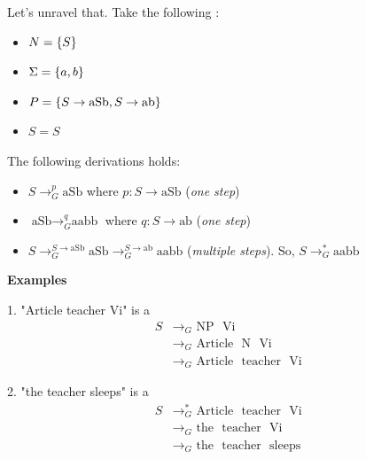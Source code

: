 Let's unravel that. Take the following :
\begin{itemize}
    \item $N = \left\{S\right\}$
    \item $\Sigma = \left\{a,b\right\}$
    \item $P = \left\{S \to \text{aSb}, S \to \text{ab}\right\}$
    \item $S = S$
\end{itemize}
The following derivations holds:
\begin{itemize}
    \item $S \to_{G}^{p} \text{aSb}$ where $p: S \to \text{aSb}$ (\textit{one step})
    \item $\text{aSb} \to_{G}^{q} \text{aabb}$ where $q: S \to \text{ab}$ (\textit{one step})
    \item $S \to_{G}^{S \to \text{aSb}} \text{aSb} \to_{G}^{S \to \text{ab}} \text{aabb}$ (\textit{multiple steps}). So, $S \to_{G}^{*} \text{aabb}$
\end{itemize}




\textbf{Examples}

1. "Article teacher Vi" is a 
\begin{align*}
S &{\to_G} \text{ NP } \text{ Vi } \\
&{\to_G} \text{ Article } \text{ N } \text{ Vi } \\
&{\to_G} \text{ Article } \text{ teacher } \text{ Vi }
\end{align*}

2. "the teacher sleeps" is a 
\begin{align*}
S &{\to_G^{*}} \text{ Article } \text{ teacher } \text{ Vi } \\
&{\to_G} \text{ the } \text{ teacher } \text{ Vi } \\
&{\to_G} \text{ the } \text{ teacher } \text{ sleeps }
\end{align*}


